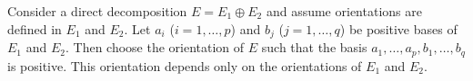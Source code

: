Consider a direct decomposition $E = E_1 \oplus E_2$ and assume orientations are defined in $E_1$ and $E_2$. Let $a_i$ ($i = 1, \ldots, p$) and $b_j$ ($j = 1, \ldots, q$) be positive bases of $E_1$ and $E_2$. Then choose the orientation of $E$ such that the basis $a_1, \ldots, a_p, b_1, \ldots, b_q$ is positive. This orientation depends only on the orientations of $E_1$ and $E_2$.
